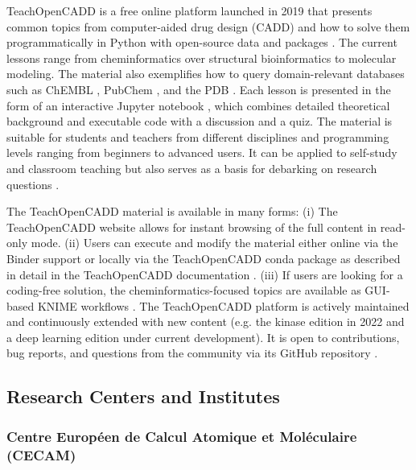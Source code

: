 \documentclass[9pt,review]{livecoms}
\begin{document}
TeachOpenCADD is a free online platform launched in 2019 that presents common topics from computer-aided drug design (CADD) and how to solve them programmatically in Python with open-source data and packages \cite{TeachOpenCADD2019, TeachOpenCADD2022, TeachOpenCADDKinaseEdition}. The current lessons range from cheminformatics over structural bioinformatics to molecular modeling. The material also exemplifies how to query domain-relevant databases such as ChEMBL \cite{Mendez_2018_ChEMBL}, PubChem \cite{Kim_2021_PubChem}, and the PDB \cite{Burley_2020_PDB}. 
Each lesson is presented in the form of an interactive Jupyter notebook \cite{Kluyver_2016_Jupyter}, which combines detailed theoretical background and executable code with a discussion and a quiz. The material is suitable for students and teachers from different disciplines and programming levels ranging from beginners to advanced users. It can be applied to self-study and classroom teaching but also serves as a basis for debarking on research questions \cite{TeachOpenCADDTeaching}. 

The TeachOpenCADD material is available in many forms: (i) The TeachOpenCADD website \cite{TOC_Website} allows for instant browsing of the full content in read-only mode. (ii) Users can execute and modify the material either online via the Binder \cite{binder} support or locally via the TeachOpenCADD conda package \cite{conda_forge_community_2015_4774216, conda_forge_toc} as described in detail in the TeachOpenCADD documentation \cite{TOC_Documentation}. (iii) If users are looking for a coding-free solution, the cheminformatics-focused topics are available as GUI-based KNIME workflows \cite{TeachOpenCADDKNIME2019}. The TeachOpenCADD platform is actively maintained and continuously extended with new content (e.g. the kinase edition in 2022 \cite{TeachOpenCADDKinaseEdition} and a deep learning edition under current development). It is open to contributions, bug reports, and questions from the community via its GitHub repository \cite{TOC_Website}.



\subsection{Research Centers and Institutes}

\subsubsection{Centre Européen de Calcul Atomique et Moléculaire (CECAM)}
\end{document}
